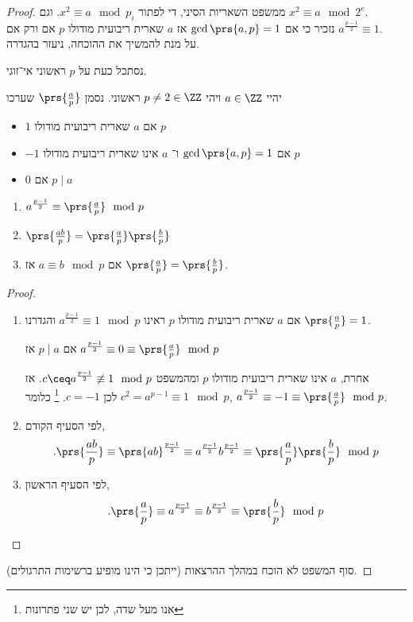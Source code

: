 \documentclass[a4paper,10pt,twoside,openany]{book}
\begin{document}
\begin{proof}
ממשפט השאריות הסיני, די לפתור
$x^2 \equiv a \mod{p_i}$.
וגם
$x^2 \equiv a\mod{2^e}$.
\\
נזכיר כי אם
$\gcd\prs{a,p} = 1$
אז
$a$
שארית ריבועית מודולו
$p$
אם ורק אם
$a^{\frac{p-1}{2}} \equiv 1$.\\
על מנת להמשיך את ההוכחה, ניעזר בהגדרה.

נסתכל כעת על
$p$
ראשוני אי־זוגי.

\begin{definition}
יהיי
$a \in \ZZ$
ויהי
$p\neq 2 \in \ZZ$
ראשוני.
נסמן
$\prs{\frac{a}{p}}$
שערכו
\begin{itemize}
\item $1$
אם
$a$
שארית ריבועית מודולו
$p$
\item $-1$
אם
$\gcd\prs{a,p} = 1$
ו־%
$a$
אינו שארית ריבועית מודולו
$p$
\item $0$
אם
$p \mid a$
\end{itemize}
\end{definition}

\begin{theorem}
\begin{enumerate}
\item $a^{\frac{p-1}{2}} \equiv \prs{\frac{a}{p}} \mod{p}$
\item $\prs{\frac{ab}{p}} = \prs{\frac{a}{p}} \prs{\frac{b}{p}}$
\item אם
$a \equiv b \mod{p}$
אז
$\prs{\frac{a}{p}} = \prs{\frac{b}{p}}$.
\end{enumerate}
\end{theorem}
\begin{proof}
\begin{enumerate}
\item אם
$a$
שארית ריבועית מודולו
$p$
ראינו
$a^{\frac{p-1}{2}} \equiv 1 \mod{p}$
והגדרנו
$\prs{\frac{a}{p}} = 1$.

אם
$p \mid a$
אז
$a^{\frac{p-1}{2}} \equiv 0 \equiv \prs{\frac{a}{p}} \mod{p}$

אחרת,
$a$
אינו שארית ריבועית מודולו
$p$
ומהמשפט
$c \ceq a^{\frac{p-1}{2}} \not\equiv 1 \mod{p}$.
אז
$c^2 = a^{p-1} \equiv 1 \mod{p}$
לכן
$c = -1$.%
\footnote{אנו מעל שדה, לכן יש שני פתרונות}
כלומר,
$a^{\frac{p-1}{2}} \equiv -1 \equiv \prs{\frac{a}{p}} \mod{p}$.

\item %
לפי הסעיף הקודם,
\[\text{.} \prs{\frac{ab}{p}} \equiv \prs{ab}^{\frac{p-1}{2}} \equiv a^{\frac{p-1}{2}} b^{\frac{p-1}{2}} \equiv \prs{\frac{a}{p}} \prs{\frac{b}{p}} \mod{p}\]

\item %
לפי הסעיף הראשון,
\[\text{.} \prs{\frac{a}{p}} \equiv a^{\frac{p-1}{2}} \equiv b^{\frac{p-1}{2}} \equiv \prs{\frac{b}{p}} \mod{p}\]
\end{enumerate}
\end{proof}
סוף המשפט לא הוכח במהלך ההרצאות (ייתכן כי הינו מופיע ברשימות התרגולים).
\end{proof}
\end{document}
